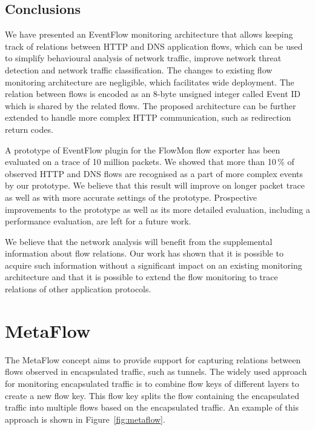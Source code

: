 \subsection{Conclusions} \label{subsec:eventflow-conclusions}

We have presented an EventFlow monitoring architecture that allows keeping track of relations between HTTP and DNS application flows, which can be used to simplify behavioural analysis of network traffic, improve network threat detection and network traffic classification. The changes to existing flow monitoring architecture are negligible, which facilitates wide deployment. The relation between flows is encoded as an 8-byte unsigned integer called Event ID which is shared by the related flows. The proposed architecture can be further extended to handle more complex HTTP communication, such as redirection return codes.

A prototype of EventFlow plugin for the FlowMon flow exporter has been evaluated on a trace of 10 million packets. We showed that more than 10\,\% of observed HTTP and DNS flows are recognised as a part of more complex events by our prototype. We believe that this result will improve on longer packet trace as well as with more accurate settings of the prototype. Prospective improvements to the prototype as well as its more detailed evaluation, including a performance evaluation, are left for a future work.

We believe that the network analysis will benefit from the supplemental information about flow relations. Our work has shown that it is possible to acquire such information without a significant impact on an existing monitoring architecture and that it is possible to extend the flow monitoring to trace relations of other application protocols.


\section{MetaFlow}\label{sec:metaflow}

The MetaFlow concept aims to provide support for capturing relations between flows observed in encapsulated traffic, such as tunnels. The widely used approach for monitoring encapsulated traffic is to combine flow keys of different layers to create a new flow key. This flow key splits the flow containing the encapsulated traffic into multiple flows based on the encapsulated traffic. An example of this approach is shown in Figure~\ref{fig:metaflow}.

